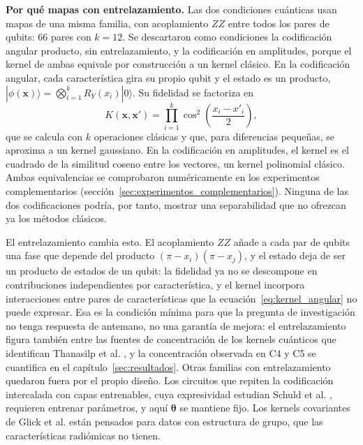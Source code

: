 \textbf{Por qué mapas con entrelazamiento.} Las dos condiciones cuánticas usan mapas de una
misma familia, con acoplamiento $ZZ$ entre todos los pares de qubits: 66 pares con $k = 12$. Se
descartaron como condiciones la codificación angular producto, sin entrelazamiento, y la
codificación en amplitudes, porque el kernel de ambas equivale por construcción a un kernel clásico. En la codificación angular, cada característica gira su propio qubit y el estado
es un producto, $|\phi(\mathbf{x})\rangle = \bigotimes_{i=1}^{k} R_Y(x_i)|0\rangle$. Su fidelidad
se factoriza en
\begin{equation}
  K(\mathbf{x},\mathbf{x}') = \prod_{i=1}^{k} \cos^2\!\left(\frac{x_i - x'_i}{2}\right),
  \label{eq:kernel_angular}
\end{equation}
que se calcula con $k$ operaciones clásicas y que, para diferencias pequeñas, se aproxima a un
kernel gaussiano. En la codificación en amplitudes, el kernel es el cuadrado de la similitud
coseno entre los vectores, un kernel polinomial clásico. Ambas equivalencias se comprobaron
numéricamente en los experimentos complementarios
(sección~\ref{sec:experimentos_complementarios}). Ninguna de las dos codificaciones podría, por
tanto, mostrar una separabilidad que no ofrezcan ya los métodos clásicos.

El entrelazamiento cambia esto. El acoplamiento $ZZ$ añade a cada par de qubits una fase que
depende del producto $(\pi - x_i)(\pi - x_j)$, y el estado deja de ser un producto de estados
de un qubit: la fidelidad ya no se descompone en contribuciones independientes por
característica, y el kernel incorpora interacciones entre pares de características que la
ecuación~\eqref{eq:kernel_angular} no puede expresar. Esa es la condición mínima para que la
pregunta de investigación no tenga respuesta de antemano, no una garantía de mejora: el
entrelazamiento figura también entre las fuentes de concentración de los kernels cuánticos que
identifican Thanasilp et al. \cite{Thanasilp2024}, y la concentración observada en C4 y C5 se
cuantifica en el capítulo~\ref{sec:resultados}. Otras familias con entrelazamiento quedaron fuera
por el propio diseño. Los circuitos que repiten la codificación intercalada con capas
entrenables, cuya expresividad estudian Schuld et al. \cite{Schuld2021Encoding}, requieren
entrenar parámetros, y aquí $\boldsymbol\theta$ se mantiene fijo. Los kernels covariantes de Glick
et al. \cite{Glick2024Covariant} están pensados para datos con estructura de grupo, que las
características radiómicas no tienen.

